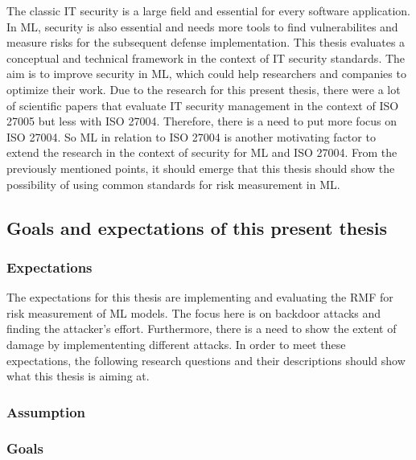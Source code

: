 The classic IT security is a large field and essential for every software application. In ML, security is also essential and needs more tools to find vulnerabilites and measure risks for
the subsequent defense implementation. This thesis evaluates a conceptual and technical framework in the context of IT security standards. The aim is to improve security in ML, which could
help researchers and companies to optimize their work. Due to the research for this present thesis, there were a lot of scientific papers that evaluate IT security management in the
context of ISO 27005 but less with ISO 27004. Therefore, there is a need to put more focus on ISO 27004. So ML in relation to ISO 27004 is another motivating factor to extend the research
in the context of security for ML and ISO 27004. From the previously mentioned points, it should emerge that this thesis should show the possibility of using common standards for risk
measurement in ML.

\subsection{Goals and expectations of this present thesis}


\subsubsection*{Expectations}

The expectations for this thesis are implementing and evaluating the RMF for risk measurement of ML models. The focus here is on backdoor attacks and finding the attacker's effort.
Furthermore, there is a need to show the extent of damage by implemententing different attacks. In order to meet these expectations, the following research questions and their
descriptions should show what this thesis is aiming at.

\subsubsection*{Assumption}


\subsubsection*{Goals}

